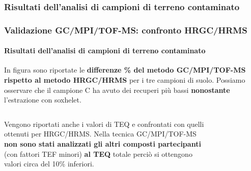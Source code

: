 \subsubsection{Risultati dell'analisi di campioni di terreno contaminato}\begin{frame}\frametitle{Validazione GC/MPI/TOF-MS: confronto HRGC/HRMS}\framesubtitle{Risultati dell'analisi di campioni di terreno contaminato}
In figura sono riportate le {\bf differenze \% del metodo GC/MPI/TOF-MS rispetto al metodo HRGC/HRMS} per i tre campioni di suolo. Possiamo osservare che il campione C ha avuto dei recuperi più bassi {\bf  nonostante} l'estrazione con soxhelet.\pause

\vspace{10 pt}

\begin{columns}
Vengono riportati anche i valori di TEQ e confrontati con quelli ottenuti per HRGC/HRMS. Nella tecnica GC/MPI/TOF-MS {\bf non sono stati analizzati gli altri composti partecipanti} (con fattori TEF minori) {\bf al TEQ} totale perciò si ottengono valori circa del 10\% inferiori.
\vspace{-10 pt}\begin{figure}{}\end{figure}
\end{columns}
\end{frame}
